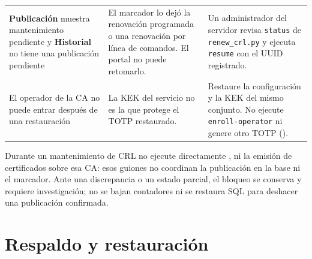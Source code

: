 {\begin{longtable}{L{3.7cm} L{4.6cm} L{7.1cm}}
    \textbf{Publicación} muestra mantenimiento pendiente y
      \textbf{Historial} no tiene una publicación pendiente
      & El marcador lo dejó la renovación programada o una renovación por
        línea de comandos. El portal no puede retomarlo.
      & Un administrador del servidor revisa \texttt{status} de
        \texttt{renew\_crl.py} y ejecuta \texttt{resume} con el UUID
        registrado. \\
    El operador de la CA no puede entrar después de una restauración
      & La KEK del servicio no es la que protege el TOTP restaurado.
      & Restaure la configuración y la KEK del mismo conjunto. No ejecute
        \texttt{enroll-operator} ni genere otro TOTP
        (). \\
\end{longtable}}

Durante un mantenimiento de CRL no ejecute directamente
,  ni la emisión de
certificados sobre esa CA: esos guiones no coordinan la publicación en la base
ni el marcador. Ante una discrepancia o un estado parcial, el bloqueo se
conserva y requiere investigación; no se bajan contadores ni se restaura SQL
para deshacer una publicación confirmada.

\section{Respaldo y restauración}\label{sec:prob-respaldo}

